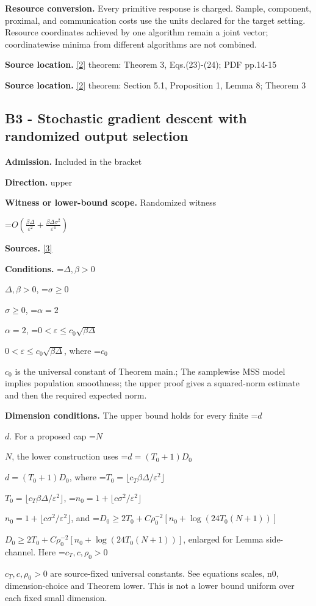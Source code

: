 \documentclass[10pt,a4paper]{article}
\newcommand{\AtlasMath}[1]{\par\begingroup\centering\setbox0=\hbox{$\displaystyle #1$}\ifdim\wd0>1.4\linewidth\typeout{ATLAS WIDE FORMULA: \the\wd0}\fi\ifdim\wd0>\linewidth\resizebox{\linewidth}{!}{\box0}\else\box0\fi\par\endgroup}
\newcommand{\AtlasInlineMath}[1]{\begingroup\setbox0=\hbox{$#1$}\ifdim\wd0>.4\linewidth\endgroup\AtlasMath{#1}\else\endgroup$#1$\fi}
\begin{document}
\textbf{Resource conversion.} Every primitive response is charged. Sample, component, proximal, and communication costs use the units declared for the target setting. Resource coordinates achieved by one algorithm remain a joint vector; coordinatewise minima from different algorithms are not combined.



\textbf{Source location.} \href{https://arxiv.org/pdf/1912.02365}{[2]} theorem: Theorem 3, Eqs.(23)-(24); PDF pp.14-15



\textbf{Source location.} \href{https://arxiv.org/pdf/1912.02365}{[2]} theorem: Section 5.1, Proposition 1, Lemma 8; Theorem 3



\subsection{B3 - Stochastic gradient descent with randomized output selection}


\textbf{Admission.} Included in the bracket



\textbf{Direction.} upper



\textbf{Witness or lower-bound scope.} Randomized witness



\AtlasMath{O\!\left(\frac{\beta\Delta}{\varepsilon^2}+\frac{\beta\Delta\sigma^2}{\varepsilon^4}\right)}


\textbf{Sources.} \href{https://github.com/WU-Wendao/Colombo/blob/main/colombo_sensorium/Complexity_altas/data/sources/colombo/0902/manuscript.pdf}{[3]}



\textbf{Conditions.} \AtlasInlineMath{\Delta,\beta>0}, \AtlasInlineMath{\sigma\ge0}, \AtlasInlineMath{\alpha=2}, \AtlasInlineMath{0<\varepsilon\le c_0\sqrt{\beta\Delta}}, where \AtlasInlineMath{c_0} is the universal constant of Theorem main.; The samplewise MSS model implies population smoothness; the upper proof gives a squared-norm estimate and then the required expected norm.



\textbf{Dimension conditions.} The upper bound holds for every finite \AtlasInlineMath{d}. For a proposed cap \AtlasInlineMath{N}, the lower construction uses \AtlasInlineMath{d=(T_0+1)D_0}, where \AtlasInlineMath{T_0=\lfloor c_T\beta\Delta/\varepsilon^2\rfloor}, \AtlasInlineMath{n_0=1+\lfloor c\sigma^2/\varepsilon^2\rfloor}, and \AtlasInlineMath{D_0\ge2T_0+C\rho_0^{-2}[n_0+\log(24T_0(N+1))]}, enlarged for Lemma side-channel. Here \AtlasInlineMath{c_T,c,\rho_0>0} are source-fixed universal constants. See equations scales, n0, dimension-choice and Theorem lower. This is not a lower bound uniform over each fixed small dimension.
\end{document}
